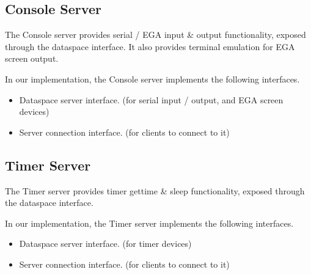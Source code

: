 \subsection{Console Server}

The Console server provides serial / EGA input \& output functionality, exposed through
the dataspace interface. It also provides terminal emulation for EGA screen output.

In our implementation, the Console server implements the following interfaces.

\begin{itemize}
    \item Dataspace server interface. (for serial input / output, and EGA screen devices)
    \item Server connection interface. (for clients to connect to it)
\end{itemize}

\subsection{Timer Server}

The Timer server provides timer gettime \& sleep functionality, exposed through
the dataspace interface.

In our implementation, the Timer server implements the following interfaces.

\begin{itemize}
    \item Dataspace server interface. (for timer devices)
    \item Server connection interface. (for clients to connect to it)
\end{itemize}
